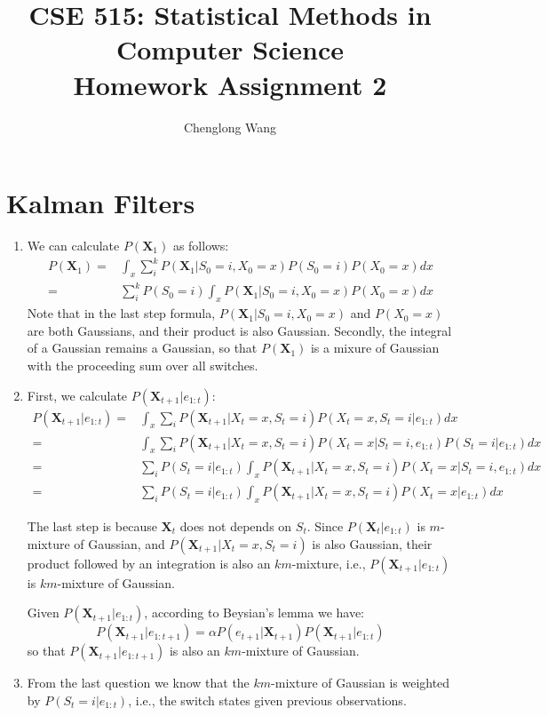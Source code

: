 \documentclass[notitlepage]{article}
\date{}
\title{{\large CSE 515: Statistical Methods in Computer Science}\\ Homework Assignment 2}
\author{Chenglong Wang}
\begin{document}
\maketitle

\section{Kalman Filters}
\begin{enumerate} 
\item We can calculate $P(\mathbf{X}_1)$ as follows:
\begin{align*}
P(\mathbf{X}_1) = & \int_{x}\sum_{i}^{k}P(\mathbf{X}_1|S_0=i, X_0=x)P(S_0=i)P(X_0=x)dx\\
								= & \sum_{i}^{k}P(S_0=i)\int_{x}P(\mathbf{X}_1|S_0=i, X_0=x)P(X_0=x)dx
\end{align*}
Note that in the last step formula, $P(\mathbf{X}_1|S_0=i, X_0=x)$ and $P(X_0=x)$ are both Gaussians, and their product is also Gaussian. Secondly, the integral of a Gaussian remains a Gaussian, so that $P(\mathbf{X}_1)$ is a mixure of Gaussian with the proceeding  sum over all switches.

\item First, we calculate $P(\mathbf{X}_{t+1} | e_{1:t})$:
\begin{align*}
P(\mathbf{X}_{t+1} | e_{1:t}) = & \int_{x}\sum_{i}P(\mathbf{X}_{t+1}|X_t=x, S_t=i)P(X_t=x, S_t=i|e_{1:t})dx\\
	= & \int_{x}\sum_{i}P(\mathbf{X}_{t+1}|X_t=x, S_t=i)P(X_t=x|S_t=i, e_{1:t})P(S_t=i|e_{1:t})dx\\
	= & \sum_{i}P(S_t=i|e_{1:t})\int_{x}P(\mathbf{X}_{t+1}|X_t=x, S_t=i)P(X_t=x|S_t=i, e_{1:t})dx\\
	= & \sum_{i}P(S_t=i|e_{1:t})\int_{x}P(\mathbf{X}_{t+1}|X_t=x, S_t=i)P(X_t=x|e_{1:t})dx
\end{align*}

The last step is because $\mathbf{X}_t$ does not depends on $S_t$. Since $P(\mathbf{X}_t|e_{1:t})$ is $m$-mixture of Gaussian, and $P(\mathbf{X}_{t+1}|X_t=x, S_t=i)$ is also Gaussian, their product followed by an integration is also an $km$-mixture, i.e., $P(\mathbf{X}_{t+1} | e_{1:t})$ is $km$-mixture of Gaussian.

Given $P(\mathbf{X}_{t+1} | e_{1:t})$, according to Beysian's lemma we have:
$$P(\mathbf{X}_{t+1} | e_{1:t+1}) = \alpha P(e_{t+1}|\mathbf{X}_{t+1})P(\mathbf{X}_{t+1} | e_{1:t})$$
so that $P(\mathbf{X}_{t+1} | e_{1:t+1})$ is also an $km$-mixture of Gaussian.

\item From the last question we know that the $km$-mixture of Gaussian is weighted by $P(S_t=i|e_{1:t})$, i.e., the switch states given previous observations.

\end{enumerate}
\end{document}
